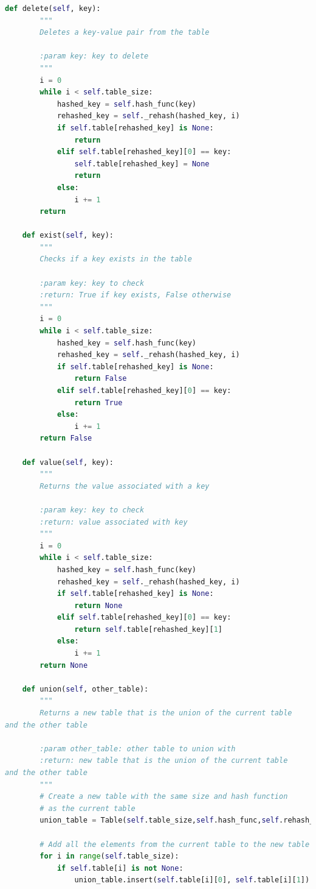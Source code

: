 \documentclass{article}
\begin{document}
\begin{lstlisting}[language=Python,label={lst:codesrc}]
    def delete(self, key):
        """
        Deletes a key-value pair from the table

        :param key: key to delete
        """
        i = 0
        while i < self.table_size:
            hashed_key = self.hash_func(key)
            rehashed_key = self._rehash(hashed_key, i)
            if self.table[rehashed_key] is None:
                return
            elif self.table[rehashed_key][0] == key:
                self.table[rehashed_key] = None
                return
            else:
                i += 1
        return

    def exist(self, key):
        """
        Checks if a key exists in the table

        :param key: key to check
        :return: True if key exists, False otherwise
        """
        i = 0
        while i < self.table_size:
            hashed_key = self.hash_func(key)
            rehashed_key = self._rehash(hashed_key, i)
            if self.table[rehashed_key] is None:
                return False
            elif self.table[rehashed_key][0] == key:
                return True
            else:
                i += 1
        return False

    def value(self, key):
        """
        Returns the value associated with a key

        :param key: key to check
        :return: value associated with key
        """
        i = 0
        while i < self.table_size:
            hashed_key = self.hash_func(key)
            rehashed_key = self._rehash(hashed_key, i)
            if self.table[rehashed_key] is None:
                return None
            elif self.table[rehashed_key][0] == key:
                return self.table[rehashed_key][1]
            else:
                i += 1
        return None

    def union(self, other_table):
        """
        Returns a new table that is the union of the current table
and the other table

        :param other_table: other table to union with
        :return: new table that is the union of the current table
and the other table
        """
        # Create a new table with the same size and hash function
        # as the current table
        union_table = Table(self.table_size,self.hash_func,self.rehash_type)

        # Add all the elements from the current table to the new table
        for i in range(self.table_size):
            if self.table[i] is not None:
                union_table.insert(self.table[i][0], self.table[i][1])


\end{lstlisting}
\end{document}
